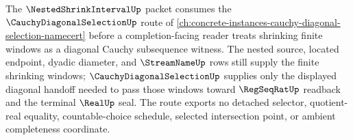The $\NestedShrinkIntervalUp$ packet consumes the $\CauchyDiagonalSelectionUp$ route of \autoref{ch:concrete-instances-cauchy-diagonal-selection-namecert} before a completion-facing reader treats shrinking finite windows as a diagonal Cauchy subsequence witness. The nested source, located endpoint, dyadic diameter, and $\StreamNameUp$ rows still supply the finite shrinking windows; $\CauchyDiagonalSelectionUp$ supplies only the displayed diagonal handoff needed to pass those windows toward $\RegSeqRatUp$ readback and the terminal $\RealUp$ seal. The route exports no detached selector, quotient-real equality, countable-choice schedule, selected intersection point, or ambient completeness coordinate.
